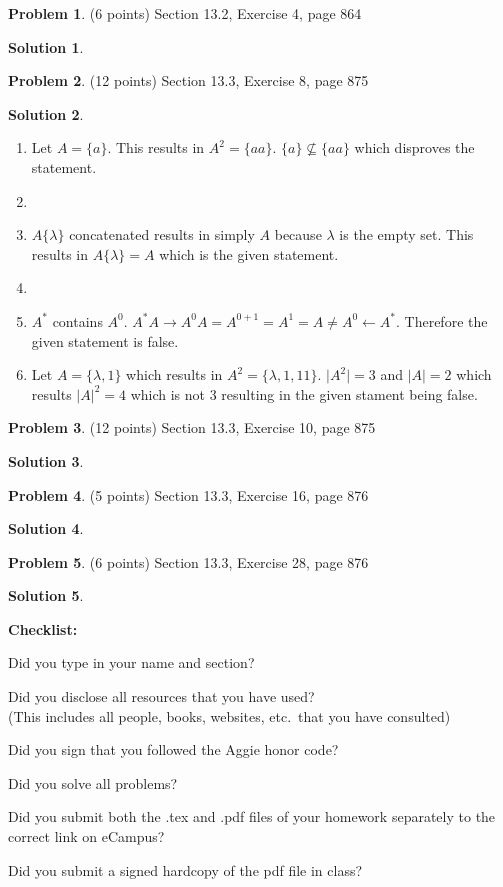 \documentclass{article}
\theoremstyle{definition}
\newtheorem{problem}{Problem}
\newtheorem*{solution}{Solution}
\newcommand{\checklist}{\noindent\textbf{Checklist:}
\begin{compactitem}[$\Box$] 
\item Did you type in your name and section? 
\item Did you disclose all resources that you have used? \\
(This includes all people, books, websites, etc.\ that you have consulted)
\item Did you sign that you followed the Aggie honor code? 
\item Did you solve all problems? 
\item Did you submit both the .tex and .pdf files of your homework separately 
to the correct link on eCampus?
\item Did you submit a signed hardcopy of the pdf file in class? 
\end{compactitem}
}
\begin{document}
\begin{problem} (6 points)
Section 13.2, Exercise 4, page 864
\end{problem}
\begin{solution} \ \\
 
\end{solution}

\begin{problem} (12 points)
Section 13.3, Exercise 8, page 875
\end{problem}
\begin{solution} \ \\
\begin{enumerate}
  \item Let $ A = \{ a \} $. This results in $A^2 = \{ aa \}$. $\{ a \} \nsubseteq \{ aa \} $ which disproves the statement.
  
  \item 
  
  \item $A\{\lambda \}$ concatenated results in simply $A$ because $\lambda$ is the empty set.
  This results in $A\{\lambda \} = A$ which is the given statement.
  
  \item 
  
  \item $A^*$ contains $A^0$. $A^* A \rightarrow A^0 A = A^{0+1} = A^1 = A \neq A^0 \leftarrow A^*$. Therefore the given statement is false.  
  
  \item
  Let $A = \{\lambda, 1 \}$ which results in $A^2 = \{\lambda, 1, 11 \}$. $\vert A^2 \vert = 3$ and $\vert A \vert = 2$ which results $\vert A \vert ^2 = 4$ which is not 3 resulting in the given stament being false.
\end{enumerate}
\end{solution}

\begin{problem} (12 points)
Section 13.3, Exercise 10, page 875
\end{problem}
\begin{solution} 
\end{solution}

\begin{problem} (5 points)
Section 13.3, Exercise 16, page 876
\end{problem}
\begin{solution} 
\end{solution}

\begin{problem} (6 points)
Section 13.3, Exercise 28, page 876
\end{problem}
\begin{solution} 
\end{solution}

\goodbreak
\checklist
\end{document}
